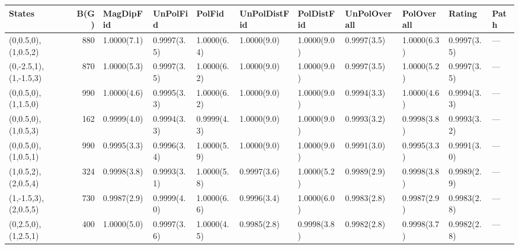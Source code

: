 \begin{tabular}{lrlllllllll}
\hline
 States                &   B(G) & MagDipFid   & UnPolFid    & PolFid      & UnPolDistFid   & PolDistFid   & UnPolOverall   & PolOverall   & Rating      & Path   \\
\hline
 (0,0.5,0),(1,0.5,2)   &    880 & 1.0000(7.1) & 0.9997(3.5) & 1.0000(6.4) & 1.0000(9.0)    & 1.0000(9.0)  & 0.9997(3.5)    & 1.0000(6.3)  & 0.9997(3.5) & ---    \\
 (0,-2.5,1),(1,-1.5,3) &    870 & 1.0000(5.3) & 0.9997(3.5) & 1.0000(6.2) & 1.0000(9.0)    & 1.0000(9.0)  & 0.9997(3.5)    & 1.0000(5.2)  & 0.9997(3.5) & ---    \\
 (0,0.5,0),(1,1.5,0)   &    990 & 1.0000(4.6) & 0.9995(3.3) & 1.0000(6.2) & 1.0000(9.0)    & 1.0000(9.0)  & 0.9994(3.3)    & 1.0000(4.6)  & 0.9994(3.3) & ---    \\
 (0,0.5,0),(1,0.5,3)   &    162 & 0.9999(4.0) & 0.9994(3.3) & 0.9999(4.3) & 1.0000(9.0)    & 1.0000(9.0)  & 0.9993(3.2)    & 0.9998(3.8)  & 0.9993(3.2) & ---    \\
 (0,0.5,0),(1,0.5,1)   &    990 & 0.9995(3.3) & 0.9996(3.4) & 1.0000(5.9) & 1.0000(9.0)    & 1.0000(9.0)  & 0.9991(3.0)    & 0.9995(3.3)  & 0.9991(3.0) & ---    \\
 (1,0.5,2),(2,0.5,4)   &    324 & 0.9998(3.8) & 0.9993(3.1) & 1.0000(5.8) & 0.9997(3.6)    & 1.0000(5.2)  & 0.9989(2.9)    & 0.9998(3.8)  & 0.9989(2.9) & ---    \\
 (1,-1.5,3),(2,0.5,5)  &    730 & 0.9987(2.9) & 0.9999(4.0) & 1.0000(6.6) & 0.9996(3.4)    & 1.0000(6.0)  & 0.9983(2.8)    & 0.9987(2.9)  & 0.9983(2.8) & ---    \\
 (0,2.5,0),(1,2.5,1)   &    400 & 1.0000(5.0) & 0.9997(3.6) & 1.0000(4.5) & 0.9985(2.8)    & 0.9998(3.8)  & 0.9982(2.8)    & 0.9998(3.7)  & 0.9982(2.8) & ---    \\
\hline
\end{tabular}